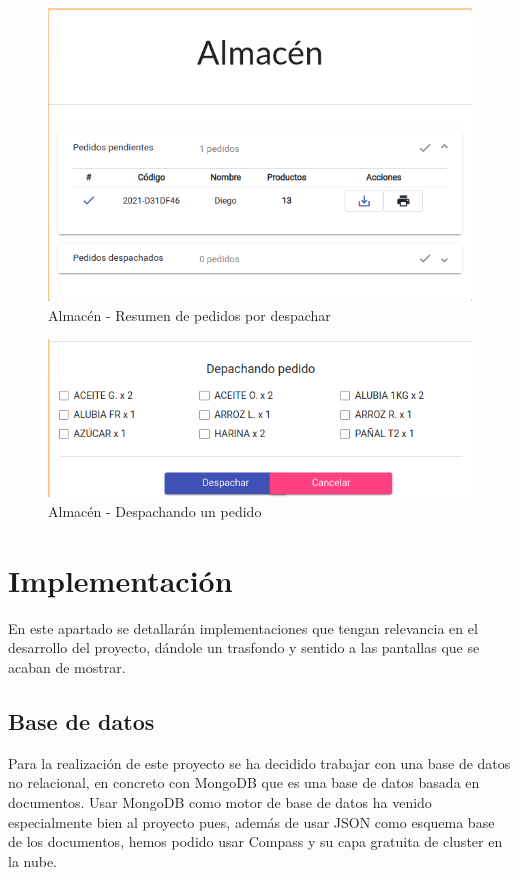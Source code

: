 \begin{figure}[h]
\centering
\includegraphics[scale=0.5]{archivos/almacen_1.png}
\caption{Almacén - Resumen de pedidos por despachar}
\label{fig:almacen_resumen}
\end{figure}

\begin{figure}[h]
\centering
\includegraphics[scale=0.5]{archivos/almacen_2.png}
\caption{Almacén - Despachando un pedido}
\label{fig:almacen_despachando}
\end{figure}
\clearpage

\section{Implementación}
En este apartado se detallarán implementaciones que tengan relevancia en el desarrollo del proyecto, dándole un trasfondo y sentido a las pantallas que se acaban de mostrar.

\subsection{Base de datos}
Para la realización de este proyecto se ha decidido trabajar con una base de datos no relacional, en concreto con MongoDB que es una base de datos basada en documentos. Usar MongoDB como motor de base de datos ha venido especialmente bien al proyecto pues, además de usar JSON como esquema base de los documentos, hemos podido usar Compass y su capa gratuita de cluster en la nube.

